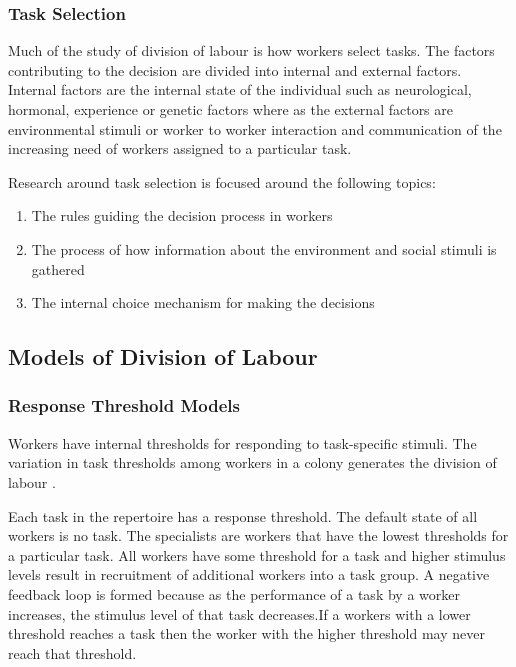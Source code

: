 \subsubsection{Task Selection}
Much of the study of division of labour is how workers select tasks. The factors contributing to the decision are divided into internal and external factors. Internal factors are the internal state of the individual such as neurological, hormonal, experience or genetic factors where as the external factors are environmental stimuli or worker to worker interaction and communication of the increasing need of workers assigned to a particular task. \cite{beshers2001models}

Research around task selection is focused around the following topics: 
\begin{enumerate}
	\item The rules guiding the decision process in workers
	\item The process of how information about the environment and social stimuli is gathered
	\item The internal choice mechanism for making the decisions
\end{enumerate}

\subsection{Models of Division of Labour}
\subsubsection{Response Threshold Models}

Workers have internal thresholds for responding to task-specific stimuli. The variation in task thresholds among workers in a colony generates the division of labour \cite{robinson1992regulation}. %

Each task in the repertoire has a response threshold. The default state of all workers is no task. The specialists are workers that have the lowest thresholds for a particular task. All workers have some threshold for a task and higher stimulus levels result in recruitment of additional workers into a task group. A negative feedback loop is formed because as the performance of a task by a worker increases, the stimulus level of that task decreases.If a workers with a lower threshold reaches a task then the worker with the higher threshold may never reach that threshold. \cite{beshers2001models} %

